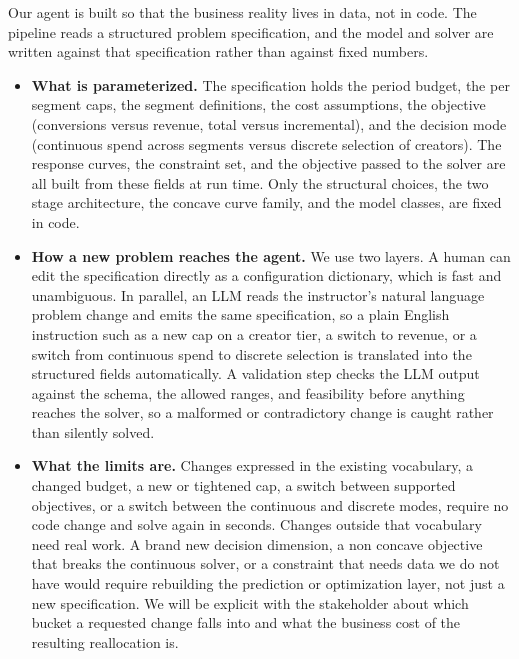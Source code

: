 \documentclass[11pt]{article}
\begin{document}
Our agent is built so that the business reality lives in data, not in code. The pipeline reads a structured problem specification, and the model and solver are written against that specification rather than against fixed numbers.

\begin{itemize}[leftmargin=2em, itemsep=3pt]
  \item \textbf{What is parameterized.} The specification holds the period budget, the per segment caps, the segment definitions, the cost assumptions, the objective (conversions versus revenue, total versus incremental), and the decision mode (continuous spend across segments versus discrete selection of creators). The response curves, the constraint set, and the objective passed to the solver are all built from these fields at run time. Only the structural choices, the two stage architecture, the concave curve family, and the model classes, are fixed in code.
  \item \textbf{How a new problem reaches the agent.} We use two layers. A human can edit the specification directly as a configuration dictionary, which is fast and unambiguous. In parallel, an LLM reads the instructor's natural language problem change and emits the same specification, so a plain English instruction such as a new cap on a creator tier, a switch to revenue, or a switch from continuous spend to discrete selection is translated into the structured fields automatically. A validation step checks the LLM output against the schema, the allowed ranges, and feasibility before anything reaches the solver, so a malformed or contradictory change is caught rather than silently solved.
  \item \textbf{What the limits are.} Changes expressed in the existing vocabulary, a changed budget, a new or tightened cap, a switch between supported objectives, or a switch between the continuous and discrete modes, require no code change and solve again in seconds. Changes outside that vocabulary need real work. A brand new decision dimension, a non concave objective that breaks the continuous solver, or a constraint that needs data we do not have would require rebuilding the prediction or optimization layer, not just a new specification. We will be explicit with the stakeholder about which bucket a requested change falls into and what the business cost of the resulting reallocation is.
\end{itemize}

\end{document}
